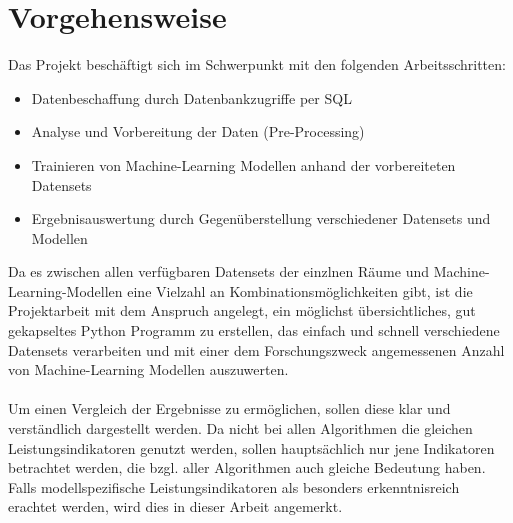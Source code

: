 



\section{Vorgehensweise}


Das Projekt beschäftigt sich im Schwerpunkt mit den folgenden Arbeitsschritten:
\begin{itemize}
    \item Datenbeschaffung durch Datenbankzugriffe per SQL
    \item Analyse und Vorbereitung der Daten (Pre-Processing)
    \item Trainieren von Machine-Learning Modellen anhand der vorbereiteten Datensets
    \item Ergebnisauswertung durch Gegenüberstellung verschiedener Datensets und Modellen
\end{itemize}
Da es zwischen allen verfügbaren Datensets der einzlnen Räume und Machine-Learning-Modellen eine Vielzahl an
Kombinationsmöglichkeiten gibt, ist die Projektarbeit mit dem Anspruch angelegt, ein möglichst übersichtliches, 
gut gekapseltes Python Programm zu erstellen, das einfach und schnell verschiedene Datensets  
verarbeiten und mit einer dem Forschungszweck angemessenen Anzahl von Machine-Learning Modellen auszuwerten. \\\\
Um einen Vergleich der Ergebnisse zu ermöglichen, sollen diese klar und verständlich dargestellt werden. 
Da nicht bei allen Algorithmen die gleichen Leistungsindikatoren genutzt werden, sollen hauptsächlich nur 
jene Indikatoren betrachtet werden, die bzgl. aller Algorithmen auch gleiche Bedeutung haben. Falls 
modellspezifische Leistungsindikatoren als besonders erkenntnisreich erachtet werden, wird dies in dieser Arbeit
angemerkt.